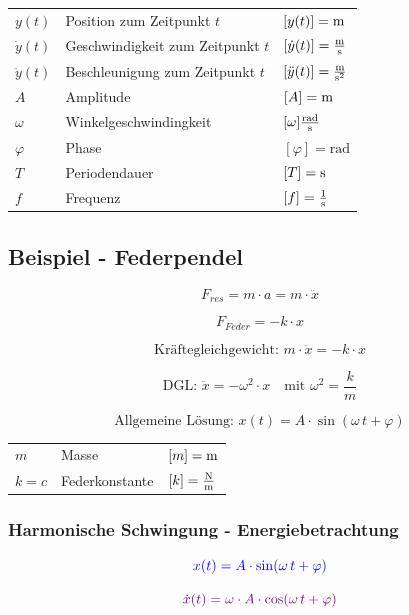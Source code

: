 \begin{tabular}{lll}
$y(t)$ & Position zum Zeitpunkt $t$ & $[y(t)] = \mathrm{m}$ \\
$\dot{y}(t)$ & Geschwindigkeit zum Zeitpunkt $t$ & $[\dot{y}(t)] = \frac{\mathrm{m}}{\mathrm{s}}$ \\ 
$\ddot{y}(t)$ & Beschleunigung  zum Zeitpunkt $t$ & $[\ddot{y}(t)] = \frac{\mathrm{m}}{\mathrm{s}^2}$ \\ 
$A$ & Amplitude & $[A] = \mathrm{m}$ \\
$\omega$ & Winkelgeschwindingkeit & $[\omega] \frac{\mathrm{rad}}{\mathrm{s}}$ \\
$\varphi$ & Phase & $[\varphi] = \mathrm{rad}$ \\ 
$T$ & Periodendauer & $[T] = \mathrm{s}$ \\
$f$ & Frequenz & $[f] = \frac{1}{\mathrm{s}}$ \\
\end{tabular}


\subsection{Beispiel - Federpendel}

\begin{minipage}{0.48\linewidth}
$$F_{res} = m \cdot a = m \cdot \ddot{x}$$ 
\end{minipage}
\hfill
\begin{minipage}{0.48\linewidth}
$$F_{Feder} = -k \cdot x$$
\end{minipage}

$$ \text{Kräftegleichgewicht: } m \cdot \ddot{x} = -k \cdot x$$


$$ \boxed{ \text{DGL: } \ddot{x} = - \omega^2 \cdot x \quad \text{mit } \omega^2 = \frac{k}{m}  }$$

$$ \text{Allgemeine Lösung: } x(t) = A \cdot \sin(\omega \, t + \varphi)$$


\begin{tabular}{lll}
$m$ & Masse & $[m] = \mathrm{m}$ \\
$k=c$ & Federkonstante & $[k] = \frac{\mathrm{N}}{\mathrm{m}}$
\end{tabular}





\subsubsection{Harmonische Schwingung - Energiebetrachtung}

\begin{minipage}{0.48\linewidth}
$$ \textcolor{blue}{x(t) = A \cdot \sin(\omega \, t + \varphi)} $$ 
\end{minipage}
\hfill
\begin{minipage}{0.48\linewidth}
$$  \textcolor{violet}{\dot{x}(t) = \omega \cdot A \cdot \cos(\omega \, t + \varphi)} $$ 
\end{minipage}



